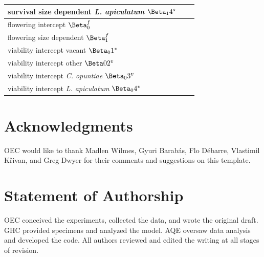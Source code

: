\documentclass[11pt]{article}\usepackage[sc]{mathpazo} %
\begin{document}
\begin{table}[]
\begin{tabular}{l|l|l}
    survival size dependent \textit{L. apiculatum} $\Beta_14^s$ & & \\
    \hline
    flowering intercept $\Beta_0^f$ & & \\
    flowering size dependent $\Beta_1^f$ & & \\
    \hline
    viability intercept vacant $\Beta_01^v$ & & \\
    viability intercept other $\Beta02^v$ & & \\
    viability intercept \textit{C. opuntiae} $\Beta_03^v$ & & \\
    viability intercept \textit{L. apiculatum} $\Beta_04^v$ & & 
  \end{tabular}
  \end{table}
			
    
  
    

\section*{Acknowledgments}

OEC would like to thank Madlen Wilmes, Gyuri Barab\'{a}s, Flo D\'{e}barre, Vlastimil K\v{r}ivan, and Greg Dwyer for their comments and suggestions on this template.


\section*{Statement of Authorship}

OEC conceived the experiments, collected the data, and wrote the original draft.
GHC provided specimens and analyzed the model.
AQE oversaw data analysis and developed the code. 
All authors reviewed and edited the writing at all stages of revision.
\end{document}
